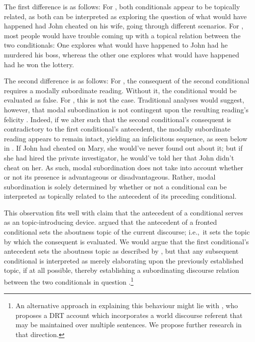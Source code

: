 The first difference is as follows: For , both conditionals appear to be topically related, as both can be interpreted as exploring the question of what would have happened had John cheated on his wife, going through different scenarios. For , most people would have trouble coming up with a topical relation between the two conditionals: One explores what would have happened to John had he murdered his boss, whereas the other one explores what would have happened had he won the lottery.

The second difference is as follows: For , the consequent of the second conditional requires a modally subordinate reading. Without it, the conditional would be evaluated as false. For , this is not the case. Traditional analyses would suggest, however, that modal subordination is not contingent upon the resulting reading's felicity \parencite{Roberts1987,Roberts1989}. Indeed, if we alter  such that the second conditional's consequent is contradictory to the first conditional's antecedent, the modally subordinate reading appears to remain intact, yielding an infelicitous sequence, as seen below in .
\ex
{}
If John had cheated on Mary, she would've never found out about it;\linebreak{} but if she had hired the private investigator, he would've told her that John didn't cheat on her.
\xe
As such, modal subordination does not take into account whether or not its presence is advantageous or disadvantageous. Rather, modal subordination is solely determined by whether or not a conditional can be interpreted as topically related to the antecedent of its preceding conditional.

This observation fits well with  claim that the antecedent of a conditional serves as an topic-introducing device. \textcite{Ebert2008,Ebert2014} argued that the antecedent of a fronted conditional sets the aboutness topic of the current discourse; i.e.,~it sets the topic by which the consequent is evaluated. We would argue that the first conditional's antecedent sets the aboutness topic as described by \textcite{Ebert2008,Ebert2014}, but that any subsequent conditional is interpreted as merely elaborating upon the previously established topic, if at all possible, thereby establishing a subordinating discourse relation between the two conditionals in question \parencite{Asher2005}.\footnote{An alternative approach in explaining this behaviour might lie with \textcite{Eckardt2021}, who proposes a DRT account which incorporates a world discourse referent that may be maintained over multiple sentences. We propose further research in that direction.}

